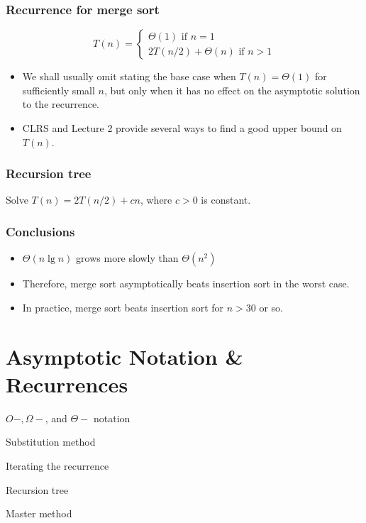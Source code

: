 \documentclass[11pt]{elegantbook}
\begin{document}
\subsection{Recurrence for merge sort}
$$
T(n)=\left\{\begin{array}{l}
\Theta(1) \text { if } n=1 \\
2 T(n / 2)+\Theta(n) \text { if } n>1
\end{array}\right.
$$
\begin{note}
  \begin{itemize}
    \item We shall usually omit stating the base case when $T(n)=\Theta(1)$ for sufficiently small $n$, but only when it has no effect on the asymptotic solution to the recurrence. 
    \item CLRS and Lecture 2 provide several ways to find a good upper bound on $T(n)$.
  \end{itemize}
\end{note}
\subsection{Recursion tree}
\begin{example}
  Solve $T(n)=2 T(n / 2)+c n$, where $c>0$ is constant.
\end{example}
\subsection{Conclusions}
\begin{itemize}
  \item $\Theta(n \lg n)$ grows more slowly than $\Theta\left(n^{2}\right)$
  \item Therefore, merge sort asymptotically beats insertion sort in the worst case.
  \item In practice, merge sort beats insertion sort for $n > 30$ or so.            
\end{itemize}
\chapter{Asymptotic Notation \& Recurrences}
\begin{introduction}
  \item $O-, \Omega-$, and $\Theta-$ notation
  \item Substitution method
  \item Iterating the recurrence
  \item Recursion tree
  \item Master method
\end{introduction}
\end{document}
